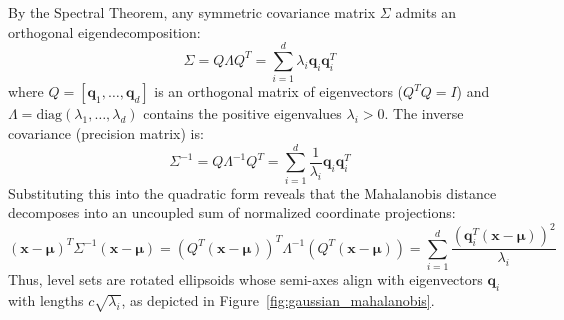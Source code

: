 By the Spectral Theorem, any symmetric covariance matrix $\Sigma$ admits an orthogonal eigendecomposition:
\begin{equation}
\Sigma = Q \Lambda Q^T = \sum_{i=1}^d \lambda_i \mathbf{q}_i \mathbf{q}_i^T
\end{equation}
where $Q = [\mathbf{q}_1, \dots, \mathbf{q}_d]$ is an orthogonal matrix of eigenvectors ($Q^T Q = I$) and $\Lambda = \text{diag}(\lambda_1, \dots, \lambda_d)$ contains the positive eigenvalues $\lambda_i > 0$. The inverse covariance (precision matrix) is:
\begin{equation}
\Sigma^{-1} = Q \Lambda^{-1} Q^T = \sum_{i=1}^d \frac{1}{\lambda_i} \mathbf{q}_i \mathbf{q}_i^T
\end{equation}
Substituting this into the quadratic form reveals that the Mahalanobis distance decomposes into an uncoupled sum of normalized coordinate projections:
\begin{equation}
(\mathbf{x} - \boldsymbol{\mu})^T \Sigma^{-1} (\mathbf{x} - \boldsymbol{\mu}) = (Q^T(\mathbf{x} - \boldsymbol{\mu}))^T \Lambda^{-1} (Q^T(\mathbf{x} - \boldsymbol{\mu})) = \sum_{i=1}^d \frac{(\mathbf{q}_i^T(\mathbf{x} - \boldsymbol{\mu}))^2}{\lambda_i}
\end{equation}
Thus, level sets are rotated ellipsoids whose semi-axes align with eigenvectors $\mathbf{q}_i$ with lengths $c\sqrt{\lambda_i}$, as depicted in Figure~\ref{fig:gaussian_mahalanobis}.

